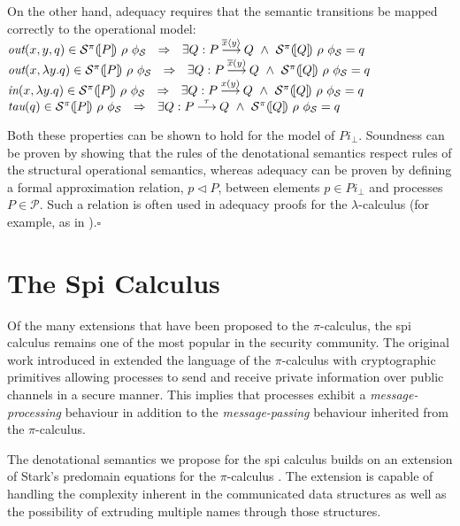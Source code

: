 \documentclass[10pt,a4paper,final,oneside,fleqn]{book}
\newcommand*{\todefoutpi}{\mathbin{\mathop{\longrightarrow}\limits^{\overline{x}\langle y\rangle}}}
\newcommand*{\todefoutbpi}{\mathbin{\mathop{\longrightarrow}\limits^{\overline{x}{(}y{)}}}}
\newcommand*{\todefinpi}{\mathbin{\mathop{\longrightarrow}\limits^{x(y)}}}
\newcommand*{\todeftaupi}{\mathbin{\mathop{\longrightarrow}\limits^{\tau}}}
\begin{document}
\noindent
On the other hand, adequacy requires that the semantic transitions be mapped correctly to the operational model:\\
$\mbox{{\itshape out}}(x,y,q)\in\mathcal{S}^{\pi}(\![P]\!)~\rho~\phi_\mathcal{S}~~\Rightarrow~~\exists Q:P\todefoutpi Q~\wedge~\mathcal{S}^{\pi}(\![Q]\!)~\rho~\phi_\mathcal{S}=q$\\
$\mbox{{\itshape out}}(x,\lambda y.q)\in\mathcal{S}^{\pi}(\![P]\!)~\rho~\phi_\mathcal{S}~~\Rightarrow~~\exists Q:P\todefoutbpi Q~\wedge~\mathcal{S}^{\pi}(\![Q]\!)~\rho~\phi_\mathcal{S}=q$\\
$\mbox{{\itshape in}}(x,\lambda y.q)\in\mathcal{S}^{\pi}(\![P]\!)~\rho~\phi_\mathcal{S}~~\Rightarrow~~\exists Q:P\todefinpi Q~\wedge~\mathcal{S}^{\pi}(\![Q]\!)~\rho~\phi_\mathcal{S}=q$\\
$\mbox{{\itshape tau}}(q)\in\mathcal{S}^{\pi}(\![P]\!)~\rho~\phi_\mathcal{S}~~\Rightarrow~~\exists Q:P\todeftaupi Q~\wedge~\mathcal{S}^{\pi}(\![Q]\!)~\rho~\phi_\mathcal{S}=q$\vspace{5mm}


\noindent
Both these properties can be shown to hold for the model of $Pi_\bot$.  Soundness can be proven by showing that the rules of the denotational semantics respect rules of the structural operational semantics, whereas adequacy can be proven by defining a formal approximation relation, $p\vartriangleleft P$, between elements $p\in Pi_\bot$ and processes $P\in\mathcal{P}$. Such a relation is often used in adequacy proofs for the $\lambda$-calculus (for example, as in \cite{pitts2}).\hfill$\square$

\section{The Spi Calculus}
Of the many extensions that have been proposed to the $\pi$-calculus, the spi calculus remains one of the most popular in the security community.  The original work introduced in \cite{abadi1} extended the language of the $\pi$-calculus with cryptographic primitives allowing processes to send and receive private information over public channels in a secure manner.  This implies that processes exhibit a {\itshape message-processing\/} behaviour in addition to the {\itshape message-passing\/} behaviour inherited from the $\pi$-calculus.

The denotational semantics we propose for the spi calculus builds on an extension of Stark's predomain equations for the $\pi$-calculus \cite{stark1}.  The extension is capable of handling the complexity inherent in the communicated data structures as well as the possibility of extruding multiple names through those structures.
\end{document}
